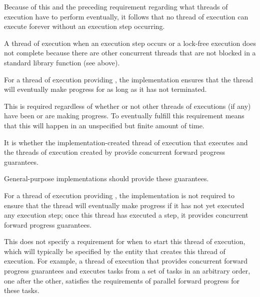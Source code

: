 \pnum
\begin{note}
Because of this and the preceding requirement regarding what threads of execution
have to perform eventually, it follows that no thread of execution can execute
forever without an execution step occurring.
\end{note}

\pnum
A thread of execution 
when an execution step occurs or a
lock-free execution does not complete because there are other concurrent threads
that are not blocked in a standard library function (see above).

\pnum
{}%
For a thread of execution providing ,
the implementation ensures that the thread will eventually make progress for as
long as it has not terminated.
\begin{note}
This is required regardless of whether or not other threads of executions (if any)
have been or are making progress. To eventually fulfill this requirement means that
this will happen in an unspecified but finite amount of time.
\end{note}

\pnum
It is  whether the
implementation-created thread of execution that executes
 and the threads of execution created by
 provide concurrent forward progress
guarantees.
\begin{note}
General-purpose implementations should provide these guarantees.
\end{note}

\pnum
{}%
For a thread of execution providing ,
the implementation is not required to ensure that the thread will eventually make
progress if it has not yet executed any execution step; once this thread has
executed a step, it provides concurrent forward progress guarantees.

\pnum
\begin{note}
This does not specify a requirement for when to start this thread of execution,
which will typically be specified by the entity that creates this thread of
execution. For example, a thread of execution that provides concurrent forward
progress guarantees and executes tasks from a set of tasks in an arbitrary order,
one after the other, satisfies the requirements of parallel forward progress for
these tasks.
\end{note}

